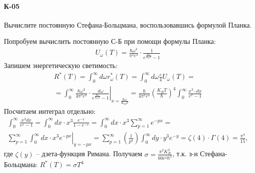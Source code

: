 \documentclass[__main__.tex]{subfiles}
\begin{document}
\paragraph{К-05}
Вычислите постоянную Стефана-Больцмана, воспользовавшись формулой Планка.

Попробуем вычислить постоянную С-Б при помощи формулы Планка:
    \begin{gather*}
    U_\omega(T)=\frac{\hbar\omega^3}{\pi^2c^3}\cdot\frac{1}{e^{\frac{\hbar\omega}{K_BT}}-1}
    \end{gather*}
    Запишем энергетическую светимость:
    \begin{gather*}
    R^\ast(T)
    =
    \int_{0}^{\infty}d\omega r^\ast_\omega(T)
    =
    \int_{0}^{\infty}d\omega\frac{c}{4}U_\omega(T)
    =\\
    =
    \left.
    \int_{0}^{\infty}\frac{\hbar\omega^3}{4\pi^2c^2}\cdot\frac{d\omega}{e^{\frac{\hbar\omega}{K_BT}}-1}
    \right|_{x=\frac{\hbar\omega}{K_BT}}
    =
    \frac{\hbar}{4\pi^2c^2}\left(\frac{K_BT}{\hbar}\right)^4\int_{0}^{\infty}\frac{x^3\cdot dx}{e^x-1}
    \end{gather*}
    Посчитаем интеграл отдельно:
    \begin{gather*}
    \int_{0}^{\infty}\frac{x^3dx}{e^x-1}
    =
    \int_{0}^{\infty}dx\cdot x^3\frac{e^{-x}}{1-e^{-x}}
    =
    \int_{0}^{\infty}dx\cdot x^3\sum_{p=1}^{\infty}e^{-px}
    =\\
    \left.
    \sum_{p=1}^{\infty}\int_{0}^{\infty}dx\cdot x^3e^{-px}
    \right|_{y=-px}
    =
    \sum_{p=1}^{\infty}\left(\frac{1}{p^4}\right)\int_{0}^{\infty}dy\cdot y^3e^{-y}
    =
    \zeta(4)\cdot\Gamma(4)
    =
    \frac{\pi^4}{15},
    \end{gather*}
    где $\zeta(y)$ -- дзета-функция Римана.
    Получаем $\sigma=\frac{\pi^2K_B^4}{60c^2\hbar^3}$, т.к. з-н Стефана-Больцмана: $R^\ast(T)=\sigma T^4$
\end{document}
